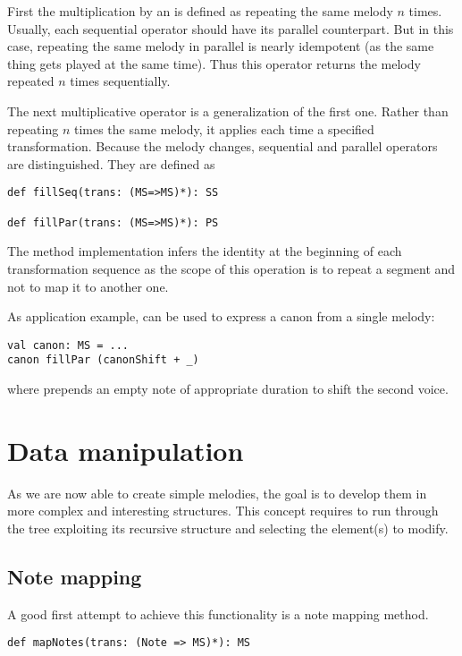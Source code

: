 \documentclass[twocolumn, 11pt]{article}
\begin{document}
First the multiplication by an  is defined as repeating the same melody $n$ times. Usually, each sequential operator should have its parallel counterpart. But in this case, repeating the same melody in parallel is nearly idempotent (as the same thing gets played at the same time). Thus this operator returns the melody repeated $n$ times sequentially.

The next multiplicative operator is a generalization of the first one. Rather than repeating $n$ times the same melody, it applies each time a specified transformation. Because the melody changes, sequential and parallel operators are distinguished. They are defined as
\begin{lstlisting}
def fillSeq(trans: (MS=>MS)*): SS

def fillPar(trans: (MS=>MS)*): PS
\end{lstlisting}
The method implementation infers the identity at the beginning of each transformation sequence as the scope of this operation is to repeat a segment and not to map it to another one.

As application example,  can be used to express a canon from a single melody:
\begin{lstlisting}
val canon: MS = ...
canon fillPar (canonShift + _)
\end{lstlisting}
where  prepends an empty note of appropriate duration to shift the second voice.

\section{Data manipulation}

As we are now able to create simple melodies, the goal is to develop them in more complex and interesting structures.
This concept requires to run through the tree exploiting its recursive structure and selecting the element(s) to modify.



\subsection{Note mapping}

A good first attempt to achieve this functionality is a note mapping method.

\begin{lstlisting}
def mapNotes(trans: (Note => MS)*): MS
\end{lstlisting}
\end{document}
